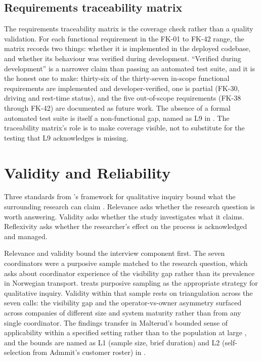\subsection{Requirements traceability matrix}
\label{sec:eval-traceability}

The requirements traceability matrix is the coverage check rather than a quality validation. For each functional requirement in the FK-01 to FK-42 range, the matrix records two things: whether it is implemented in the deployed codebase, and whether its behaviour was verified during development. ``Verified during development'' is a narrower claim than passing an automated test suite, and it is the honest one to make: thirty-six of the thirty-seven in-scope functional requirements are implemented and developer-verified, one is partial (FK-30, driving and rest-time status), and the five out-of-scope requirements (FK-38 through FK-42) are documented as future work. The absence of a formal automated test suite is itself a non-functional gap, named as L9 in . The traceability matrix's role is to make coverage visible, not to substitute for the testing that L9 acknowledges is missing.


\section{Validity and Reliability}
\label{sec:validity}

Three standards from \textcite{malterud2001lancet}'s framework for qualitative inquiry bound what the surrounding research can claim \parencite[p.~483]{malterud2001lancet}. Relevance asks whether the research question is worth answering. Validity asks whether the study investigates what it claims. Reflexivity asks whether the researcher's effect on the process is acknowledged and managed.

Relevance and validity bound the interview component first. The seven coordinators were a purposive sample matched to the research question, which asks about coordinator experience of the visibility gap rather than its prevalence in Norwegian transport. \textcite[p.~485]{malterud2001lancet} treats purposive sampling as the appropriate strategy for qualitative inquiry. Validity within that sample rests on triangulation across the seven calls: the visibility gap and the operator-vs-owner asymmetry surfaced across companies of different size and system maturity rather than from any single coordinator. The findings transfer in Malterud's bounded sense of applicability within a specified setting rather than to the population at large \parencite[p.~486]{malterud2001lancet}, and the bounds are named as L1 (sample size, brief duration) and L2 (self-selection from Admmit's customer roster) in .

